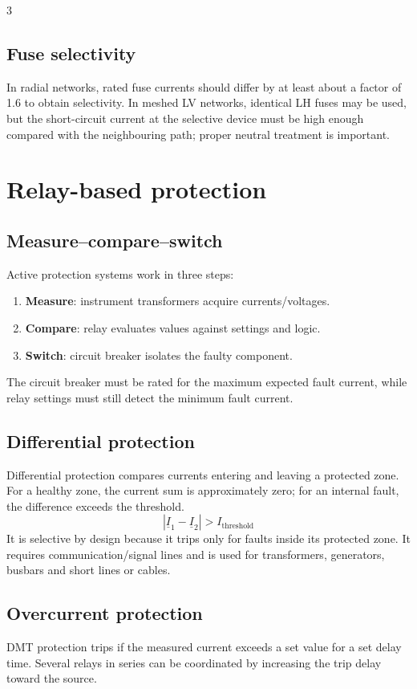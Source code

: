 \documentclass[9pt, landscape, a4paper]{article}
\begin{document}
\begin{multicols*}{3}
\subsection{Fuse selectivity}
In radial networks, rated fuse currents should differ by at least about a factor
of 1.6 to obtain selectivity. In meshed LV networks, identical LH fuses may be
used, but the short-circuit current at the selective device must be high enough
compared with the neighbouring path; proper neutral treatment is important.

\section{Relay-based protection}
\subsection{Measure--compare--switch}
Active protection systems work in three steps:
\begin{enumerate}[label=\arabic*.]
  \item \textbf{Measure}: instrument transformers acquire currents/voltages.
  \item \textbf{Compare}: relay evaluates values against settings and logic.
  \item \textbf{Switch}: circuit breaker isolates the faulty component.
\end{enumerate}
The circuit breaker must be rated for the maximum expected fault current, while
relay settings must still detect the minimum fault current.

\subsection{Differential protection}
Differential protection compares currents entering and leaving a protected
zone. For a healthy zone, the current sum is approximately zero; for an internal
fault, the difference exceeds the threshold.
\[
  \left|\underline I_1-\underline I_2\right|>I_{\mathrm{threshold}}
\]
It is selective by design because it trips only for faults inside its protected
zone. It requires communication/signal lines and is used for transformers,
generators, busbars and short lines or cables.

\subsection{Overcurrent protection}
DMT protection trips if the measured current exceeds a set value for a set
delay time. Several relays in series can be coordinated by increasing the trip
delay toward the source.


\end{multicols*}
\end{document}
